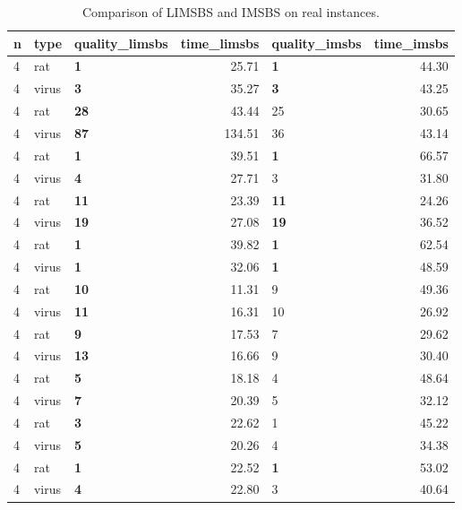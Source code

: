 \begin{table}
	\centering
	\caption{Comparison of LIMSBS and IMSBS on real instances.}
	\label{tab:real_results}
	\begin{tabular}{ll|lr|lr}
		\hline
		n &  type & quality\_limsbs &  time\_limsbs & quality\_imsbs &  time\_imsbs \\
		\hline \hline
		4 &   rat &      \textbf{1} &        25.71 &     \textbf{1} &       44.30 \\
		4 & virus &      \textbf{3} &        35.27 &     \textbf{3} &       43.25 \\
		4 &   rat &     \textbf{28} &        43.44 &            25 &       30.65 \\
		4 & virus &     \textbf{87} &       134.51 &            36 &       43.14 \\
		4 &   rat &      \textbf{1} &        39.51 &     \textbf{1} &       66.57 \\
		4 & virus &      \textbf{4} &        27.71 &             3 &       31.80 \\
		4 &   rat &     \textbf{11} &        23.39 &    \textbf{11} &       24.26 \\
		4 & virus &     \textbf{19} &        27.08 &    \textbf{19} &       36.52 \\
		4 &   rat &      \textbf{1} &        39.82 &     \textbf{1} &       62.54 \\
		4 & virus &      \textbf{1} &        32.06 &     \textbf{1} &       48.59 \\
		4 &   rat &     \textbf{10} &        11.31 &             9 &       49.36 \\
		4 & virus &     \textbf{11} &        16.31 &            10 &       26.92 \\
		4 &   rat &      \textbf{9} &        17.53 &             7 &       29.62 \\
		4 & virus &     \textbf{13} &        16.66 &             9 &       30.40 \\
		4 &   rat &      \textbf{5} &        18.18 &             4 &       48.64 \\
		4 & virus &      \textbf{7} &        20.39 &             5 &       32.12 \\
		4 &   rat &      \textbf{3} &        22.62 &             1 &       45.22 \\
		4 & virus &      \textbf{5} &        20.26 &             4 &       34.38 \\
		4 &   rat &      \textbf{1} &        22.52 &     \textbf{1} &       53.02 \\
		4 & virus &      \textbf{4} &        22.80 &             3 &       40.64 \\
		\hline \hline
	\end{tabular}
\end{table}
